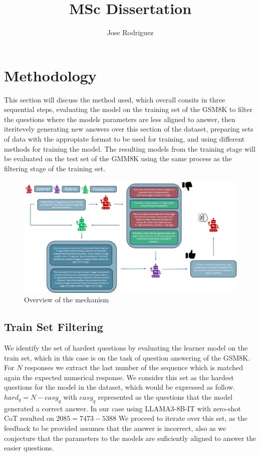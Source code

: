 \documentclass[a4paper,10pt]{article}
\title{MSc Dissertation}
\author{Jose Rodriguez}
\begin{document}
\maketitle

\begin{abstract}

\end{abstract}

\section{Methodology}

This section will discuss the method used, which overall consits in three sequential steps, evaluating the model on the training set of the GSM8K to filter the questions where the models parameters are less aligned to answer, then iteritevely generating new answers over this section of the dataset, preparing sets of data with the appropiate format to be used for training, and using different methods for training the model. The resulting models from the training stage will be evaluated on the test set of the GMM8K using the same process as the filtering stage of the training set.
\begin{figure}[h]
\centering
\includegraphics[scale=0.3]{figures/method_sample}
\caption{Overview of the mechanism}
\end{figure}


\subsection{Train Set Filtering}
We identify the set of hardest questions by evaluating the learner model on the train set, which in this case is on the task of question answering of the GSM8K. For $N$ responses we extract the last number of the sequence which is matched again the expected numerical response. We consider this set as the hardest questions for the model in the dataset, which would be expressed as follow. $ hard_q =  N - easy_q $ with $easy_q$ represented as the questions that the model generated a correct answer.
In our case using LLAMA3-8B-IT with zero-shot CoT resulted on $ 2085 = 7473 - 5388 $ We proceed to iterate over this set, as the feedback to be provided assumes that the answer is incorrect, also as we conjecture that the parameters to the models are suficiently aligned to answer the easier questions.
\end{document}
